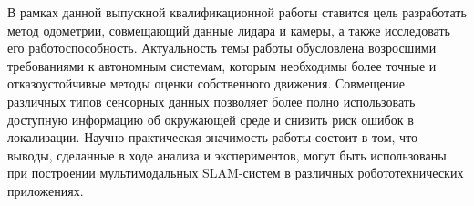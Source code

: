 В рамках данной выпускной квалификационной работы ставится цель разработать метод одометрии, совмещающий данные лидара и камеры, а также исследовать его работоспособность. 
Актуальность темы работы обусловлена возросшими требованиями к автономным системам, которым необходимы более точные и 
отказоустойчивые методы оценки собственного движения. Совмещение различных типов сенсорных данных позволяет более полно использовать 
доступную информацию об окружающей среде и снизить риск ошибок в локализации. Научно-практическая значимость работы состоит в том, 
что выводы, сделанные в ходе анализа и экспериментов, могут быть использованы при построении мультимодальных SLAM-систем в различных 
робототехнических приложениях.